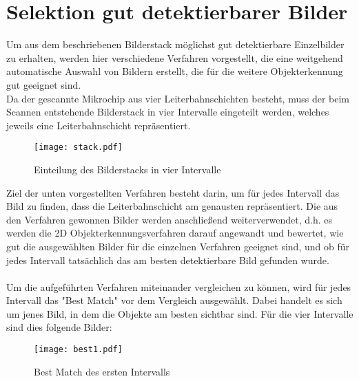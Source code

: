 
\chapter{Selektion gut detektierbarer Bilder}
\label{chap:slk}
	Um aus dem beschriebenen Bilderstack möglichst gut detektierbare Einzelbilder zu erhalten, werden hier verschiedene Verfahren vorgestellt, die eine weitgehend automatische Auswahl von Bildern erstellt, die für die weitere Objekterkennung gut geeignet sind. \\
Da der gescannte Mikrochip aus vier Leiterbahnschichten besteht, muss der beim Scannen entstehende Bilderstack in vier Intervalle eingeteilt werden, welches jeweils eine Leiterbahnschicht repräsentiert. 
\begin{figure}[H]
  \begin{center}
    \texttt{[image: stack.pdf]}
    \caption{Einteilung des Bilderstacks in vier Intervalle}
    \label{fig:intervalls}
  \end{center}
\end{figure}
Ziel der unten vorgestellten Verfahren besteht darin, um für jedes Intervall das Bild zu finden, dass die Leiterbahnschicht am genausten repräsentiert.
Die aus den Verfahren gewonnen Bilder werden anschließend weiterverwendet, d.h. es werden die 2D Objekterkennungsverfahren darauf angewandt und bewertet, wie gut die ausgewählten Bilder für die einzelnen Verfahren geeignet sind, und ob für jedes Intervall tatsächlich das am besten detektierbare Bild gefunden wurde.\\ \\

Um die aufgeführten Verfahren miteinander vergleichen zu können, wird für jedes Intervall das "Best Match" vor dem Vergleich ausgewählt. Dabei handelt es sich um jenes Bild, in dem die Objekte am besten sichtbar sind. Für die vier Intervalle sind dies folgende Bilder:

\begin{figure}[H]
  \begin{center}
    \texttt{[image: best1.pdf]}
    \caption{Best Match des ersten Intervalls}
    \label{fig:bestmatch1}
  \end{center}
\end{figure}

